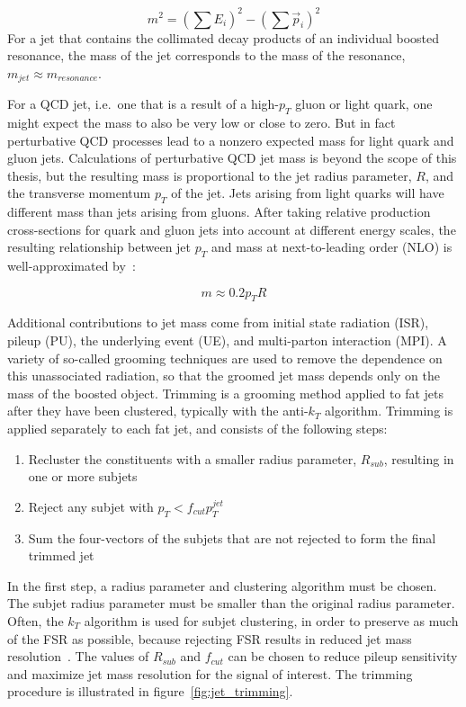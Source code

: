 \begin{equation}\label{eq:jet_mass}
    m^2 = \left(\sum E_i\right)^2 - \left(\sum \vec{p}_i \right)^2
\end{equation}
For a jet that contains the collimated decay products of an individual boosted resonance, the mass of the jet corresponds to the mass of the resonance, $m_{jet} \approx m_{resonance}$.

For a QCD jet, i.e.\ one that is a result of a high-$p_T$ gluon or light quark, one might expect the mass to also be very low or close to zero.
But in fact perturbative QCD processes lead to a nonzero expected mass for light quark and gluon jets.
Calculations of perturbative QCD jet mass is beyond the scope of this thesis, but the resulting mass is proportional to the jet radius parameter, $R$, and the transverse momentum $p_T$ of the jet.
Jets arising from light quarks will have different mass than jets arising from gluons.
After taking relative production cross-sections for quark and gluon jets into account at different energy scales, the resulting relationship between jet $p_T$ and mass at next-to-leading order (NLO) is well-approximated by~\cite{jet-mass-nlo}:

\begin{equation}\label{eq:jet_mass_nlo}
    m \approx 0.2 p_T R
\end{equation}

Additional contributions to jet mass come from initial state radiation (ISR), pileup (PU), the underlying event (UE), and multi-parton interaction (MPI).
A variety of so-called grooming techniques are used to remove the dependence on this unassociated radiation, so that the groomed jet mass depends only on the mass of the boosted object.
Trimming is a grooming method applied to fat jets after they have been clustered, typically with the anti-$k_T$ algorithm.
Trimming is applied separately to each fat jet, and consists of the following steps:

\begin{enumerate}
    \item Recluster the constituents with a smaller radius parameter, $R_{sub}$, resulting in one or more subjets
    \item Reject any subjet with $p_{T} < f_{cut} p_T^{jet}$
    \item Sum the four-vectors of the subjets that are not rejected to form the final trimmed jet
\end{enumerate}

In the first step, a radius parameter and clustering algorithm must be chosen.
The subjet radius parameter must be smaller than the original radius parameter.
Often, the $k_T$ algorithm is used for subjet clustering, in order to preserve as much of the FSR as possible, because rejecting FSR results in reduced jet mass resolution~\cite{jet-tasi-substructure}.
The values of $R_{sub}$ and $f_{cut}$ can be chosen to reduce pileup sensitivity and maximize jet mass resolution for the signal of interest.
The trimming procedure is illustrated in figure~\ref{fig:jet_trimming}.

